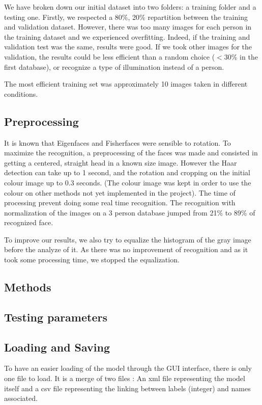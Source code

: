 We have broken down our initial dataset into two folders: a training folder and a testing one. Firstly, we respected a 80\%, 20\% repartition between the training and validation dataset. However, there was too many images for each person in the training dataset and we experienced overfitting. Indeed, if the training and validation test was the same, results were good. If we took other images for the validation, the results could be less efficient than a random choice ($<$30\% in the first database), or recognize a type of illumination instead of a person.

The most efficient training set was approximately 10 images taken in different conditions. 

\subsection{Preprocessing}
It is known that Eigenfaces and Fisherfaces were sensible to rotation. To maximize the recognition, a preprocessing of the faces was made and consisted in getting a centered, straight head in a known size image. However the Haar detection can take up to 1 second, and the rotation and cropping on the initial colour image up to 0.3 seconds. (The colour image was kept in order to use the colour on other methods not yet implemented in the project). The time of processing prevent doing some real time recognition. The recognition with normalization of the images on a 3 person database jumped from 21\% to 89\% of recognized face.

To improve our results, we also try to equalize the histogram of the gray image before the analyze of it. As there was no improvement of recognition and as it took some processing time, we stopped the equalization.

\subsection{Methods}
\subsection{Testing parameters}

\subsection{Loading and Saving}
To have an easier loading of the model through the GUI interface, there is only one file to load. It is a merge of two files : An xml file representing the model itself and a csv file representing the linking between labels (integer) and names associated.
